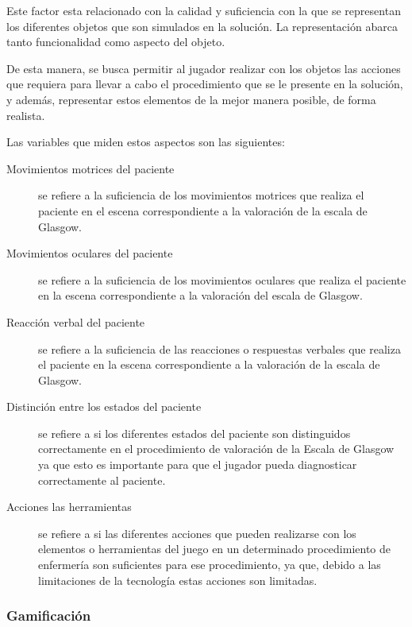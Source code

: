 Este factor esta relacionado con la calidad y suficiencia con la que se
representan los diferentes objetos que son simulados en la solución. La
representación abarca tanto funcionalidad como aspecto del objeto.

De esta manera, se busca permitir al jugador realizar con los objetos las
acciones que requiera para llevar a cabo el procedimiento que se le presente en
la solución, y además, representar estos elementos de la mejor manera posible,
de forma realista.

Las variables que miden estos aspectos son las siguientes:

\begin{description}

\item [Movimientos motrices del paciente] se refiere a la suficiencia de los
    movimientos motrices que realiza el paciente en el escena correspondiente a
    la valoración de la escala de Glasgow.

\item [Movimientos oculares del paciente] se refiere a la suficiencia de los
    movimientos oculares que realiza el paciente en la escena correspondiente a
    la valoración del escala de Glasgow.

\item [Reacción verbal del paciente] se refiere a la suficiencia de las
    reacciones o respuestas verbales que realiza el paciente en la escena
    correspondiente a la valoración de la escala de Glasgow.

\item[Distinción entre los estados del paciente] se refiere a si los diferentes
    estados del paciente son distinguidos correctamente en el procedimiento de
    valoración de la Escala de Glasgow ya que esto es importante para que el
    jugador pueda diagnosticar correctamente al paciente.

\item[Acciones las herramientas] se refiere a si las diferentes acciones que
    pueden realizarse con los elementos o herramientas del juego en un
    determinado procedimiento de enfermería son suficientes para ese
    procedimiento, ya que, debido a las limitaciones de la tecnología estas
    acciones son limitadas.

\end{description}

\subsubsection{Gamificación}
\label{sec:sub_gamificacion}

